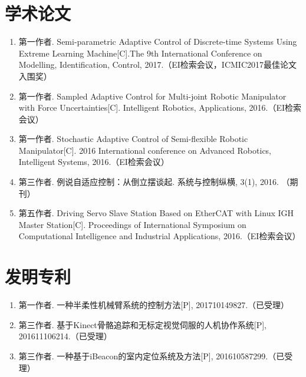 
\begin{publications}{99}
\section*{学术论文}
\begin{enumerate}%
\item 第一作者. Semi-parametric Adaptive Control of Discrete-time Systems Using Extreme Learning Machine[C].The 9th International Conference on Modelling, Identification, Control, 2017.（EI检索会议，ICMIC2017最佳论文入围奖）
\item 第一作者. Sampled Adaptive Control for Multi-joint Robotic Manipulator with Force Uncertainties[C]. Intelligent Robotics, Applications, 2016.（EI检索会议）
\item 第一作者. Stochastic Adaptive Control of Semi-flexible Robotic Manipulator[C]. 2016 International conference on Advanced Robotics, Intelligent Systems, 2016.（EI检索会议）
\item 第三作者. 例说自适应控制：从倒立摆谈起. 系统与控制纵横, 3(1), 2016. （期刊）
\item 第五作者. Driving Servo Slave Station Based on EtherCAT with Linux IGH Master Station[C]. Proceedings of International Symposium on Computational Intelligence and Industrial Applications, 2016.（EI检索会议）
\end{enumerate}

\section*{发明专利}
\begin{enumerate}%
\item 第一作者. 一种半柔性机械臂系统的控制方法[P], 201710149827.（已受理）
\item 第三作者. 基于Kinect骨骼追踪和无标定视觉伺服的人机协作系统[P], 201611106214.（已受理）
\item 第三作者. 一种基于iBeacon的室内定位系统及方法[P], 201610587299.（已受理）
\end{enumerate}



\end{publications}
